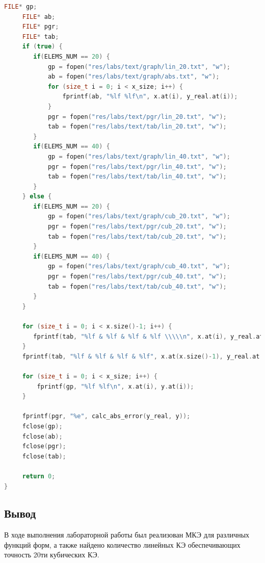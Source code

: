 \begin{lstlisting}[language=c++, label=prog,caption={\textit{Реализация МКЭ}}]
     FILE* gp;
     FILE* ab;
     FILE* pgr;
     FILE* tab;
     if (true) {
        if(ELEMS_NUM == 20) {
            gp = fopen("res/labs/text/graph/lin_20.txt", "w");
            ab = fopen("res/labs/text/graph/abs.txt", "w");
            for (size_t i = 0; i < x_size; i++) {
                fprintf(ab, "%lf %lf\n", x.at(i), y_real.at(i));
            }
            pgr = fopen("res/labs/text/pgr/lin_20.txt", "w");
            tab = fopen("res/labs/text/tab/lin_20.txt", "w");
        }
        if(ELEMS_NUM == 40) {
            gp = fopen("res/labs/text/graph/lin_40.txt", "w");
            pgr = fopen("res/labs/text/pgr/lin_40.txt", "w");
            tab = fopen("res/labs/text/tab/lin_40.txt", "w");
        }
     } else {
        if(ELEMS_NUM == 20) {
            gp = fopen("res/labs/text/graph/cub_20.txt", "w");
            pgr = fopen("res/labs/text/pgr/cub_20.txt", "w");
            tab = fopen("res/labs/text/tab/cub_20.txt", "w");
        }
        if(ELEMS_NUM == 40) {
            gp = fopen("res/labs/text/graph/cub_40.txt", "w");
            pgr = fopen("res/labs/text/pgr/cub_40.txt", "w");
            tab = fopen("res/labs/text/tab/cub_40.txt", "w");
        }
     }

     for (size_t i = 0; i < x.size()-1; i++) {
        fprintf(tab, "%lf & %lf & %lf & %lf \\\\\n", x.at(i), y_real.at(i), y.at(i), std::fabs(y_real.at(i) - y.at(i)));
     }
     fprintf(tab, "%lf & %lf & %lf & %lf", x.at(x.size()-1), y_real.at(x.size()-1), y.at(x.size()-1), std::fabs(y_real.at(x.size()-1) - y.at(x.size()-1)));

     for (size_t i = 0; i < x_size; i++) {
         fprintf(gp, "%lf %lf\n", x.at(i), y.at(i));
     }

     fprintf(pgr, "%e", calc_abs_error(y_real, y));
     fclose(gp);
     fclose(ab);
     fclose(pgr);
     fclose(tab);

     return 0;
}

\end{lstlisting}
\subsection{Вывод}

В ходе выполнения лабораторной работы был реализован МКЭ для различных функций форм, а также найдено количество линейных КЭ обеспечивающих точность 20ти кубических КЭ.




